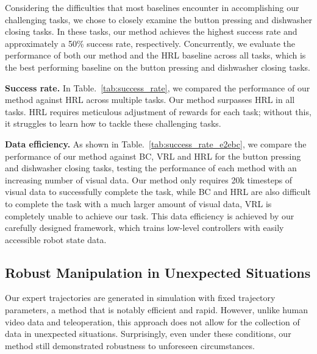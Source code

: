 Considering the difficulties that most baselines encounter in accomplishing our challenging tasks, we chose to closely examine the button pressing and dishwasher closing tasks. In these tasks, our method achieves the highest success rate and approximately a 50\% success rate, respectively. 
Concurrently, we evaluate the performance of both our method and the HRL baseline across all tasks, which is the best performing baseline on the button pressing and dishwasher closing tasks.

\textbf{Success rate.} 
In Table.~\ref{tab:success_rate}, we compared the performance of our method against HRL across multiple tasks. 
Our method surpasses HRL in all tasks. 
HRL requires meticulous adjustment of rewards for each task; without this, it struggles to learn how to tackle these challenging tasks.

\textbf{Data efficiency.} 
As shown in Table.~\ref{tab:success_rate_e2ebc}, we compare the performance of our method against BC, VRL and HRL for the button pressing and dishwasher closing tasks, testing the performance of each method with an increasing number of visual data. Our method only requires 20k timesteps of visual data to successfully complete the task, while BC and HRL are also difficult to complete the task with a much larger amount of visual data, VRL is completely unable to achieve our task. This data efficiency is achieved by our carefully designed framework, which trains low-level controllers with easily accessible robot state data.


\subsection{Robust Manipulation in Unexpected Situations}
Our expert trajectories are generated in simulation with fixed trajectory parameters, a method that is notably efficient and rapid. However, unlike human video data and teleoperation, this approach does not allow for the collection of data in unexpected situations. Surprisingly, even under these conditions, our method still demonstrated robustness to unforeseen circumstances. 

